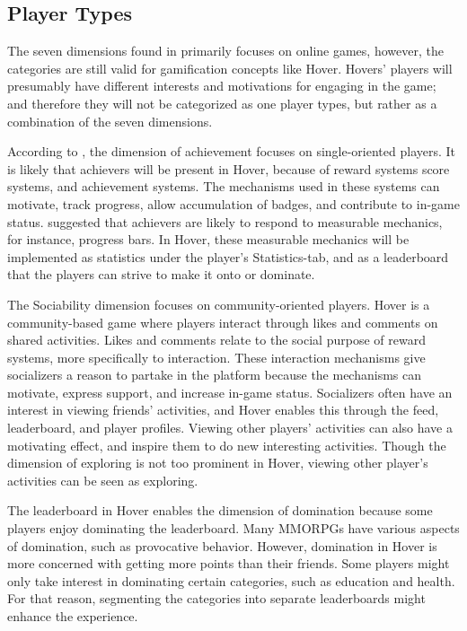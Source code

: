 \documentclass[../Main.tex]{subfiles}
\begin{document}
\subsection{Player Types}
The seven dimensions found in \citet{hamari_player_2014} primarily focuses on online games, however, the categories are still valid for gamification concepts like Hover. Hovers’ players will presumably have different interests and motivations for engaging in the game; and therefore they will not be categorized as one player types, but rather as a combination of the seven dimensions.

According to \citet{hamari_player_2014}, the dimension of achievement focuses on single-oriented players. It is likely that achievers will be present in Hover, because of reward systems score systems, and achievement systems. The mechanisms used in these systems can motivate, track progress, allow accumulation of badges, and contribute to in-game status. \citet{yee_motivations_2007} suggested that achievers are likely to respond to measurable mechanics, for instance, progress bars. In Hover, these measurable mechanics will be implemented as statistics under the player’s Statistics-tab, and as a leaderboard that the players can strive to make it onto or dominate.
    
The Sociability dimension focuses on community-oriented players. Hover is a community-based game where players interact through likes and comments on shared activities. Likes and comments relate to the social purpose of reward systems, more specifically to interaction. These interaction mechanisms give socializers a reason to partake in the platform because the mechanisms can motivate, express support, and increase in-game status.  Socializers often have an interest in viewing friends’ activities, and Hover enables this through the feed, leaderboard, and player profiles. Viewing other players’ activities can also have a motivating effect, and inspire them to do new interesting activities. Though the dimension of exploring is not too prominent in Hover, viewing other player’s activities can be seen as exploring.

The leaderboard in Hover enables the dimension of domination because some players enjoy dominating the leaderboard. Many MMORPGs have various aspects of domination, such as provocative behavior. However, domination in Hover is more concerned with getting more points than their friends. Some players might only take interest in dominating certain categories, such as education and health. For that reason, segmenting the categories into separate leaderboards might enhance the experience.
\end{document}
